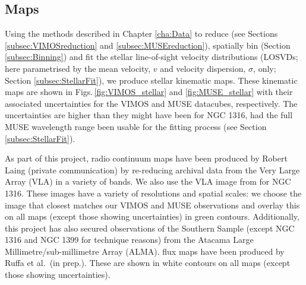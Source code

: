 	\subsection{Maps}
		\label{subsec:maps}
		Using the methods described in Chapter \ref{cha:Data} to reduce (see Sections \ref{subsec:VIMOSreduction} and \ref{subsec:MUSEreduction}), spatially bin (Section \ref{subsec:Binning}) and fit the stellar line-of-sight velocity distributions (LOSVDs; here parametrised by the mean velocity, $v$ and velocity dispersion, $\sigma$, only; Section \ref{subsec:StellarFit}), we produce stellar kinematic maps. These kinematic maps are shown in Figs.\,\ref{fig:VIMOS_stellar} and \ref{fig:MUSE_stellar} with their associated uncertainties for the VIMOS and MUSE datacubes, respectively. The uncertainties are higher than they might have been for NGC 1316, had the full MUSE wavelength range been usable for the fitting process (see Section \ref{subsec:StellarFit}).

		As part of this project, radio continuum maps have been produced by Robert Laing (private communication) by re-reducing archival data from the Very Large Array (VLA) in a variety of bands. We also use the VLA image from \citet{Lanz2010} for NGC 1316. These images have a variety of resolutions and spatial scales: we choose the image that closest matches our VIMOS and MUSE observations and overlay this on all maps (except those showing uncertainties) in green contours. Additionally, this project has also secured observations of the Southern Sample (except NGC 1316 and NGC 1399 for technique reasons) from the Atacama Large Millimetre/sub-millimetre Array (ALMA).  flux maps have been produced by Ruffa et al.\ (in prep.). These are shown in white contours on all maps (except those showing uncertainties). 

